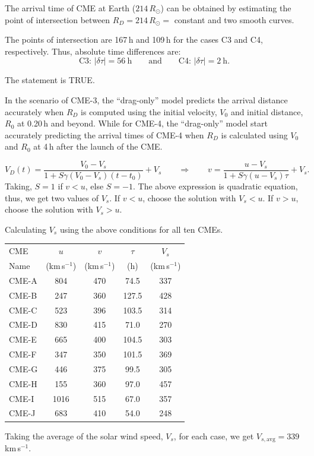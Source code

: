 \begin{description}
\item[(D02.3d)] The arrival time of CME at Earth ($214\,R_\odot$) can be
  obtained by estimating the point of intersection between
  $R_D = 214\,R_\odot = $ constant and two smooth curves.

  The points of intersection are 167\,h and 109\,h for the cases C3 and C4,
  respectively. Thus, absolute time differences are:
  \[
  \text{C3: } |\delta\tau| = 56~\mathrm{h}
  \qquad\text{and}\qquad
  \text{C4: } |\delta\tau| = 2~\mathrm{h}.
  \]
\item[(D02.3e)] The statement is TRUE.

  In the scenario of CME-3, the ``drag-only'' model predicts the arrival
  distance accurately when $R_D$ is computed using the initial velocity,
  $V_0$ and initial distance, $R_0$ at 0.20\,h and beyond. While for CME-4,
  the ``drag-only'' model start accurately predicting the arrival times of
  CME-4 when $R_D$ is calculated using $V_0$ and $R_0$ at 4\,h after the
  launch of the CME.
\item[(D02.4)]
  \[
  V_D(t) = \frac{V_0 - V_s}{1 + S\gamma(V_0-V_s)(t-t_0)} + V_s
  \qquad\Longrightarrow\qquad
  v = \frac{u - V_s}{1 + S\gamma(u-V_s)\tau} + V_s.
  \]
  Taking, $S = 1$ if $v < u$, else $S = -1$. The above expression is
  quadratic equation, thus, we get two values of $V_s$. If $v < u$, choose
  the solution with $V_s < u$. If $v > u$, choose the solution with
  $V_s > u$.

  Calculating $V_s$ using the above conditions for all ten CMEs.
  \begin{center}
  \begin{tabular}{l c c c c}
  \toprule
  CME & $u$ & $v$ & $\tau$ & $V_s$\\
  Name & (km\,s$^{-1}$) & (km\,s$^{-1}$) & (h) & (km\,s$^{-1}$)\\
  \midrule
  CME-A & 804  & 470 & 74.5  & 337\\
  CME-B & 247  & 360 & 127.5 & 428\\
  CME-C & 523  & 396 & 103.5 & 314\\
  CME-D & 830  & 415 & 71.0  & 270\\
  CME-E & 665  & 400 & 104.5 & 303\\
  CME-F & 347  & 350 & 101.5 & 369\\
  CME-G & 446  & 375 & 99.5  & 305\\
  CME-H & 155  & 360 & 97.0  & 457\\
  CME-I & 1016 & 515 & 67.0  & 357\\
  CME-J & 683  & 410 & 54.0  & 248\\
  \bottomrule
  \end{tabular}
  \end{center}
  Taking the average of the solar wind speed, $V_s$, for each case, we get
  $V_{s,\mathrm{avg}} = 339$\,km\,s$^{-1}$.
\end{description}

